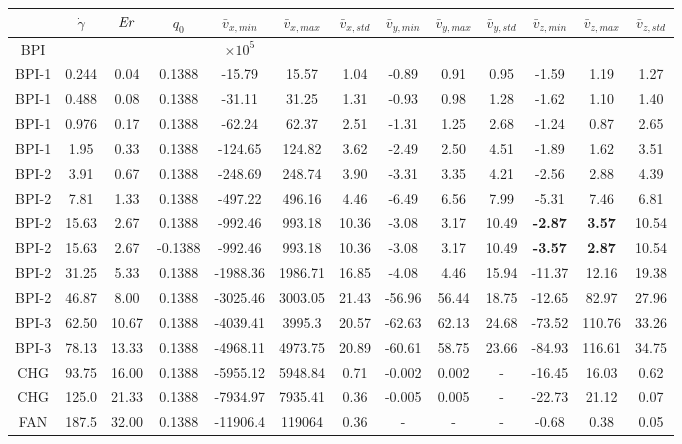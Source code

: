 \documentclass[aps,pre,reprint,superscriptaddress, twocolumn]{revtex4}
\begin{document}
\begin{table}[htpb]
\begin{tabular}{|c||c|| c || c || c |c |c||c| c| c||c| c| c|}
\hline
& $\dot{\gamma}$ & ${\it Er}$ & $q_0$ & $\bar{v}_{x,min}$ & $\bar{v}_{x,max}$ & $\bar{v}_{x,std}$ & $\bar{v}_{y,min}$ & $\bar{v}_{y,max}$ & $\bar{v}_{y,std}$ & $\bar{v}_{z,min}$ & $\bar{v}_{z,max}$ & $\bar{v}_{z,std}$ \\
\hline
BPI & & & & $\times 10^5$\\
\hline
BPI-1 & 0.244 & 0.04& 0.1388 &-15.79 &15.57 &1.04 &-0.89 &0.91 &0.95 &-1.59 &1.19 &1.27 \\
BPI-1 & 0.488 & 0.08 & 0.1388 &-31.11 &31.25 &1.31 &-0.93 &0.98 &1.28 &-1.62 &1.10 &1.40 \\
BPI-1 & 0.976 & 0.17 & 0.1388 &-62.24 &62.37 &2.51 &-1.31 &1.25 &2.68 &-1.24 &0.87 &2.65 \\
BPI-1 & 1.95 & 0.33 & 0.1388 &-124.65 &124.82 &3.62&  -2.49 &2.50 &4.51 &-1.89 & 1.62 &3.51 \\
\hline
BPI-2 & 3.91 & 0.67 & 0.1388 &-248.69 &248.74 &3.90&  -3.31 &3.35 &4.21 &-2.56 & 2.88 &4.39 \\
BPI-2 & 7.81 & 1.33 & 0.1388 &-497.22 &496.16 &4.46 &-6.49 &6.56 &7.99 &-5.31 & 7.46 &6.81 \\ 
BPI-2 & 15.63 & 2.67 & 0.1388 &-992.46 &993.18 &10.36 &-3.08 &3.17 &10.49 &\bf{-2.87} & \bf{3.57} &10.54 \\
BPI-2 & 15.63 & 2.67 & -0.1388 &-992.46 &993.18 &10.36 &-3.08 &3.17 &10.49 &\bf{-3.57} & \bf{2.87} &10.54 \\
BPI-2 & 31.25 &5.33 & 0.1388 & -1988.36 &1986.71 &16.85 &-4.08 &4.46 &15.94 &-11.37 & 12.16 &19.38\\
BPI-2 & 46.87 & 8.00 & 0.1388 & -3025.46 & 3003.05 &21.43 & -56.96 & 56.44  & 18.75 & -12.65 & 82.97  & 27.96\\
\hline
BPI-3 & 62.50 & 10.67& 0.1388 & -4039.41 &3995.3  & 20.57 & -62.63 & 62.13 & 24.68 &-73.52 & 110.76 & 33.26 \\
BPI-3 &78.13 &13.33 & 0.1388 & -4968.11 &4973.75 &20.89 &-60.61 &58.75 &23.66 &-84.93 &116.61 &34.75 \\
\hline
CHG & 93.75 &16.00 & 0.1388 & -5955.12 &5948.84 & 0.71 & -0.002 & 0.002 & -  & -16.45 & 16.03 &0.62 \\
CHG & 125.0 & 21.33& 0.1388 & -7934.97 & 7935.41 & 0.36 & -0.005 & 0.005 & - &-22.73 & 21.12 & 0.07\\
\hline
FAN & 187.5 & 32.00& 0.1388 &-11906.4  &119064 &0.36 &- &- &- &-0.68 & 0.38 & 0.05\\
\hline


\end{tabular}
\end{table}
\end{document}
